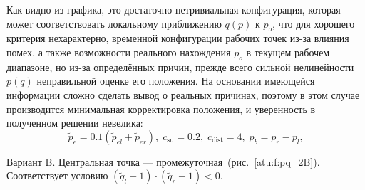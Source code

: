 Как видно из графика, это достаточно нетривиальная конфигурация,
которая может соответствовать локальному приближению
$q(p)$ к $p_o$, что для хорошего критерия нехарактерно,
временной конфигурации рабочих точек из-за влияния помех,
а также возможности реального нахождения $p_o$
в текущем рабочем диапазоне, но из-за определённых причин,
прежде всего сильной нелинейности $p(q)$
неправильной оценке его положения.
На основании имеющейся информации сложно сделать вывод
о реальных причинах, поэтому
в этом случае производится минимальная корректировка положения,
и уверенность в полученном решении невелика:
%
\begin{equation}
  \tilde{p}_e = 0.1 ( \tilde{p}_{el} + \tilde{p}_{er} ),
  \;
  c_\mathrm{su} = 0.2, \;  c_\mathrm{dist} = 4, \;   p_b = p_r - p_l,
  \label{atu:eq:pr_e_2A}
\end{equation}



Вариант B.\label{atu:d:p_eql_2B} %
Центральная точка --- промежуточная~(рис.~\ref{atu:f:pq_2B}).
Соответствует условию
$ ( \tilde{q}_l -1 ) \cdot ( \tilde{q}_r -1 ) < 0 $.

